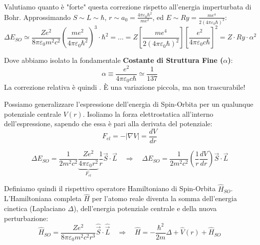 \documentclass[11pt, a4paper]{article}
\begin{document}
\noindent
Valutiamo quanto è "forte" questa correzione rispetto all'energia imperturbata di Bohr. Approssimando $S \sim L \sim \hbar$, $r \sim a_0 = \frac{4\pi\varepsilon_0\hbar^2}{me^2}$, ed $E \sim Ry = \frac{me^4}{2(4\pi\varepsilon_0\hbar)^2}$: %
\begin{equation*}
    \Delta E_{SO} \simeq \frac{Z e^2}{8\pi\varepsilon_0 m^2 c^2} \left( \frac{me^2}{4\pi\varepsilon_0\hbar^2} \right)^3 \cdot \hbar^2 = \dots = Z \left[ \frac{me^4}{2(4\pi\varepsilon_0\hbar)^2} \right] \left[ \frac{e^2}{4\pi\varepsilon_0 c\hbar} \right]^2 = Z \cdot Ry \cdot \alpha^2 %
\end{equation*}

Dove abbiamo isolato la fondamentale \textbf{Costante di Struttura Fine ($\alpha$)}: %
\begin{equation}
    \alpha \equiv \frac{e^2}{4\pi\varepsilon_0 c\hbar} \simeq \frac{1}{137} %
\end{equation}
La correzione relativa è quindi . È una variazione piccola, ma non trascurabile! %

\noindent
Possiamo generalizzare l'espressione dell'energia di Spin-Orbita per un qualunque potenziale centrale $V(r)$. Isoliamo la forza elettrostatica all'interno dell'espressione, sapendo che essa è pari alla derivata del potenziale: %
\begin{equation*}
    F_{el} = -|\nabla V| = \frac{dV}{dr} %
\end{equation*}

\begin{equation}
    \Delta E_{SO} = \frac{1}{2m^2c^2} \underbrace{ \frac{Z e^2}{4\pi\varepsilon_0 r^2} }_{F_{el}} \frac{1}{r} \vec{S} \cdot \vec{L} \quad \Rightarrow \quad \boxed{ \Delta E_{SO} = \frac{1}{2m^2c^2} \left( \frac{1}{r} \frac{dV}{dr} \right) \vec{S} \cdot \vec{L} } %
\end{equation}

\noindent
Definiamo quindi il rispettivo operatore Hamiltoniano di Spin-Orbita $\hat{H}_{SO}$. L'Hamiltoniana completa $\hat{H}$ per l'atomo reale diventa la somma dell'energia cinetica (Laplaciano $\Delta$), dell'energia potenziale centrale e della nuova perturbazione: %
\begin{equation}
    \hat{H}_{SO} = \frac{Z e^2}{8\pi\varepsilon_0 m^2 c^2 r^3} \hat{\vec{S}} \cdot \hat{\vec{L}} \quad \Rightarrow \quad \boxed{ \hat{H} = -\frac{\hbar^2}{2m}\Delta + \hat{V}(r) + \hat{H}_{SO} } %
\end{equation}
\end{document}
